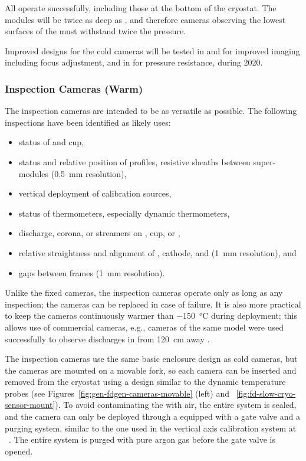 All operate successfully, including those at the bottom of the cryostat.  %
The  modules will be twice as deep as , and therefore cameras observing the lowest surfaces of the  must withstand twice the pressure.

Improved designs for the cold cameras will be tested in  and  for improved imaging including focus adjustment, and in  for pressure resistance, during 2020. 

\subsubsection{Inspection Cameras (Warm)}

The inspection cameras are intended to be as versatile as possible.
The following %
inspections have been identified as likely uses:
\begin{itemize}
\item status of  \fdth and cup,
\item status and relative position of  profiles, resistive sheaths between  super-modules (\SI{0.5}{mm} resolution),
\item vertical deployment of calibration sources,
\item status of thermometers, especially dynamic thermometers,
\item {} discharge, corona, or streamers on  \fdth, cup, or ,
\item relative straightness and alignment of , cathode, and  (\SI{1}{mm} resolution), and
\item gaps between  frames (\SI{1}{mm} resolution).
\end{itemize}

Unlike the fixed cameras, the inspection cameras operate only as
long as any inspection; the cameras can be replaced in case of failure.  It
is also more practical to keep the cameras continuously warmer than
 \SI{-150}{\celsius} during deployment; this allows use of  %
commercial cameras, %
e.g., cameras of the same model were used successfully to observe discharges
in  from \SI{120}{cm} away \cite{Auger:2015xlo}.


The inspection cameras use the same basic
enclosure design as cold cameras, but the cameras are mounted on a movable
fork, so each camera can be inserted and removed from the cryostat
using a design similar to the dynamic temperature probes (see
 Figures~\ref{fig:gen-fdgen-cameras-movable} (left) and
 ~\ref{fig:fd-slow-cryo-sensor-mount}).  To avoid contaminating the
\lar with air, the entire system is sealed, and the
camera can only be deployed through a \fdth equipped with a gate
valve and a purging system, similar to the one used in the vertical axis
calibration system at \kamland~\cite{Banks:2014hra}. The entire system
is  purged with pure argon gas before the gate valve is opened.

